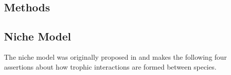 \documentclass[/home/nkappler/Research/Dissertation/
 dissertation.tex]{subfiles}
\begin{document}
\begin{bibunit}
%
%

\section{Methods}

\subsection{Niche Model} 

The niche model was originally proposed in \cite*{Williams2000} and makes the
following four assertions about how trophic interactions are formed between
species.


\end{bibunit}
\end{document}
